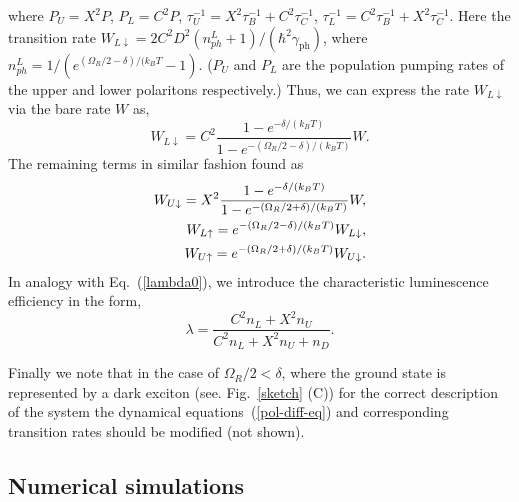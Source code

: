 \documentclass[journal=aamick,manuscript=article]{achemso}
\begin{document}
%
where $P_U=X^2 P$, $P_L=C^2 P$, $\tau_U^{-1}=X^2 \tau_B^{-1} + C^2 \tau_C^{-1}$, $\tau_L^{-1}=C^2 \tau_B^{-1} + X^2 \tau_C^{-1}$. 
Here the transition rate $W_{L\downarrow}=2C^2D^2(n_{ph}^L+1)/(\hbar^2 \gamma_{\mathrm{ph}} )$, where $n_{ph}^L=1/(e^{(\Omega_R/2-\delta)/(k_B T}-1)$. ($P_U$ and  $P_L$ are the population pumping rates of the upper and lower polaritons respectively.) Thus, we can express the rate $W_{L\downarrow}$ via the bare rate $W$ as,
%
\begin{equation}
W_{L\downarrow}=C^2 \frac{1-e^{-\delta/(k_B T)}}{1-e^{-(\Omega_R/2-\delta)/(k_B T)}} W.
\end{equation}
%
The remaining terms in similar fashion found as
%
\begin{align}
W_{U\downarrow}=X^2 \frac{1-e^{-\delta/(k_B T)}}{1-e^{-(\Omega_R/2+\delta)/(k_B T)}} W, \notag \\
W_{L\uparrow}=e^{-(\Omega_R/2-\delta)/(k_B T)} W_{L\downarrow}, \notag \\
W_{U\uparrow}=e^{-(\Omega_R/2+\delta)/(k_B T)} W_{U\downarrow}. 
\end{align}
%
In analogy with Eq.~(\ref{lambda0}), we introduce the characteristic luminescence efficiency in the form,
%
\begin{equation}
\label{lambda}
\lambda =\frac{C^2n_L+X^2n_U}{C^2n_L+X^2n_U+n_D}.
\end{equation}
%

Finally we note that in the case of $\Omega_R/2<\delta$, where the ground state is represented by a dark exciton (see. Fig.~\ref{sketch} (C)) for the correct description of the system the dynamical equations~(\ref{pol-diff-eq}) and corresponding transition rates should be modified (not shown).


\subsection*{Numerical simulations}

\end{document}
